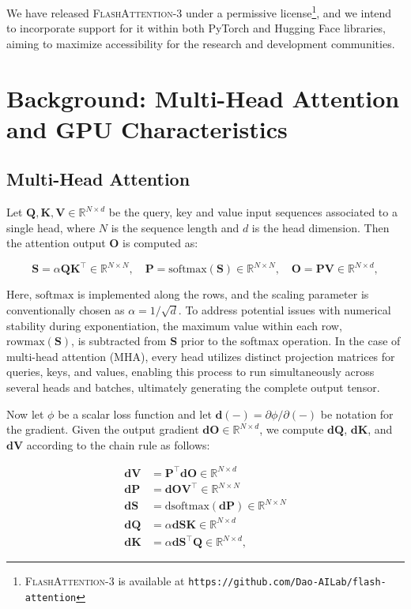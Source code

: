 \begin{enumerate}
We have released \textsc{FlashAttention-3} under a permissive license\footnote{\textsc{FlashAttention-3}
  is available at \texttt{https://github.com/Dao-AILab/flash-attention}}, and we intend to incorporate support for it within both PyTorch and Hugging Face libraries, aiming to maximize accessibility for the research and development communities.

\section{Background: Multi-Head Attention and GPU Characteristics}
\label{sec:background}

\subsection{Multi-Head Attention}
\label{subsec:multi_head_attn}

Let $\mathbf{Q}, \mathbf{K}, \mathbf{V} \in \mathbb{R}^{N \times d}$ be the query, key and value input sequences associated to a single head, where $N$ is the sequence length and $d$ is the head dimension. Then the attention output $\mathbf{O}$ is computed as:

\begin{equation*}
  \mathbf{S} = \alpha \mathbf{Q} \mathbf{K}^\top \in \mathbb{R}^{N \times N}, \quad \mathbf{P} = \mathrm{softmax}(\mathbf{S}) \in \mathbb{R}^{N \times N}, \quad \mathbf{O} = \mathbf{P}\mathbf{V} \in \mathbb{R}^{N \times d},
\end{equation*}

Here, $\mathrm{softmax}$ is implemented along the rows, and the scaling parameter is conventionally chosen as $\alpha = 1/\sqrt{d}$. To address potential issues with numerical stability during exponentiation, the maximum value within each row, $\mathrm{rowmax}(\mathbf{S})$, is subtracted from $\mathbf{S}$ prior to the softmax operation. In the case of multi-head attention (MHA), every head utilizes distinct projection matrices for queries, keys, and values, enabling this process to run simultaneously across several heads and batches, ultimately generating the complete output tensor.

Now let $\phi$ be a scalar loss function and let $\mathbf{d}(-) = \partial \phi / \partial (-)$ be notation for the gradient. Given the output gradient $\mathbf{dO} \in \mathbb{R}^{N \times d}$, we compute $\mathbf{dQ}$, $\mathbf{dK}$, and $\mathbf{dV}$ according to the chain rule as follows:

\begin{align*}
  \mathbf{dV} &= \mathbf{P}^\top \mathbf{dO} \in \mathbb{R}^{N \times d} \\
  \mathbf{dP} &= \mathbf{dO} \mathbf{V}^\top \in \mathbb{R}^{N \times N} \\
  \mathbf{dS} &= \mathrm{dsoftmax} (\mathbf{dP}) \in \mathbb{R}^{N \times N} \\
  \mathbf{dQ} &= \alpha \mathbf{dS} \mathbf{K} \in \mathbb{R}^{N \times d} \\
  \mathbf{dK} &= \alpha \mathbf{dS}^\top \mathbf{Q} \in \mathbb{R}^{N \times d},
\end{align*}


\end{enumerate}

